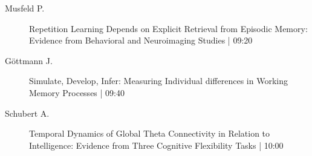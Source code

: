 \begin{symposium}
\begin{description}
                \item [ Musfeld P.] Repetition Learning Depends on Explicit Retrieval from Episodic Memory: Evidence from Behavioral and Neuroimaging Studies \textcolor{mygray}{ | 09:20}    
                
                \item [ Göttmann J.] Simulate, Develop, Infer: Measuring Individual differences in Working Memory Processes \textcolor{mygray}{ | 09:40}    
                
                \item [ Schubert A.] Temporal Dynamics of Global Theta Connectivity in Relation to Intelligence: Evidence from Three Cognitive Flexibility Tasks \textcolor{mygray}{ | 10:00}    
                
            \end{description} 
            \end{symposium}
            